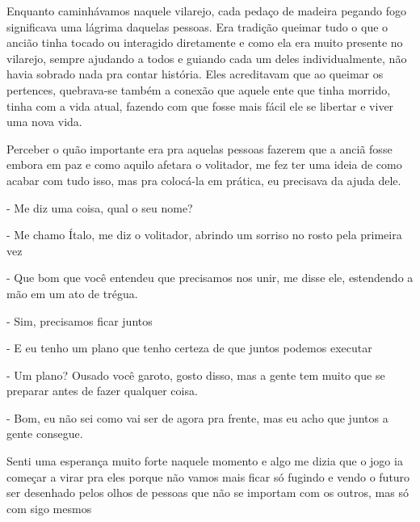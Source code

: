 Enquanto caminhávamos naquele vilarejo, cada pedaço de madeira pegando fogo significava uma lágrima daquelas pessoas. Era tradição queimar tudo o que o ancião tinha tocado ou interagido diretamente e como ela era muito presente no vilarejo, sempre ajudando a todos e guiando cada um deles individualmente, não havia sobrado nada pra contar história. Eles acreditavam que ao queimar os pertences, quebrava-se também a conexão que aquele ente que tinha morrido, tinha com a vida atual, fazendo com que fosse mais fácil ele se libertar e viver uma nova vida.

Perceber o quão importante era pra aquelas pessoas fazerem que a anciã fosse embora em paz e como aquilo afetara o volitador, me fez ter uma ideia de como acabar com tudo isso, mas pra colocá-la em prática, eu precisava da ajuda dele.

- Me diz uma coisa, qual o seu nome?

- Me chamo Ítalo, me diz o volitador, abrindo um sorriso no rosto pela primeira vez

- Que bom que você entendeu que precisamos nos unir, me disse ele, estendendo a mão em um ato de trégua.

- Sim, precisamos ficar juntos

- E eu tenho um plano que tenho certeza de que juntos podemos executar

- Um plano? Ousado você garoto, gosto disso, mas a gente tem muito que se preparar antes de fazer qualquer coisa.

- Bom, eu não sei como vai ser de agora pra frente, mas eu acho que juntos a gente consegue.

Senti uma esperança muito forte naquele momento e algo me dizia que o jogo ia começar a virar pra eles porque não vamos mais ficar só fugindo e vendo o futuro ser desenhado pelos olhos de pessoas que não se importam com os outros, mas só com sigo mesmos



